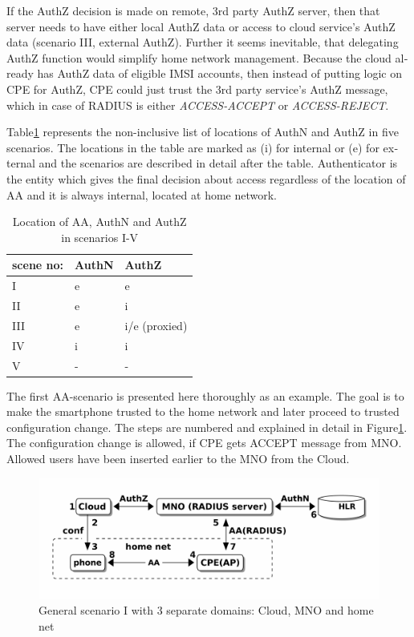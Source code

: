 \documentclass[12pt,a4paper,english]{tutthesis}
\begin{document}
\begin{otherlanguage}{english}
If the AuthZ decision is made on remote, 3rd party AuthZ server, 
then that server needs to have either local AuthZ data or access to 
cloud service's AuthZ data (scenario III, external AuthZ).
Further it seems inevitable, that delegating AuthZ function 
would simplify home network management. Because the cloud
already 
has AuthZ data of eligible IMSI accounts,
then instead of putting logic on CPE for AuthZ, CPE
could just trust the 3rd party service's AuthZ message, which in case
of RADIUS is either \emph{ACCESS-ACCEPT} or \emph{ACCESS-REJECT}.



Table\ref{table-scenarios} represents the non-inclusive list of locations of
AuthN and AuthZ in five scenarios. The locations in the table are marked as (i)
for internal or (e) for external and the scenarios are
described in detail after the table. Authenticator is the entity which
gives the final decision about access regardless of the location of AA
and it is always internal, located at home network.

\begin{table}[htb]
\caption{\label{table-scenarios}Location of AA, AuthN and AuthZ in scenarios I-V}
\centering
\begin{tabular}{lll}
scene no: & AuthN & AuthZ\\
\hline
I & e & e\\
II & e & i\\
III & e & i/e (proxied)\\
IV & i & i\\
V & - & -\\
\end{tabular}
\end{table}
\label{scenario-i}
The first AA-scenario is presented here thoroughly as an example.
The goal is to make the smartphone trusted to the home network and
later proceed to trusted configuration change.
The steps are numbered and explained in detail in Figure\ref{fig:scenario-I}.
The configuration change is allowed, if CPE gets ACCEPT message from
MNO. Allowed users have been inserted earlier to the MNO from the Cloud.


\begin{figure}[htb]
\centering
\includegraphics[width=.9\linewidth]{scenI.png}
\caption{\label{fig:scenario-I}General scenario I with 3 separate domains: Cloud, MNO and home net}
\end{figure}


\end{otherlanguage}
\end{document}
